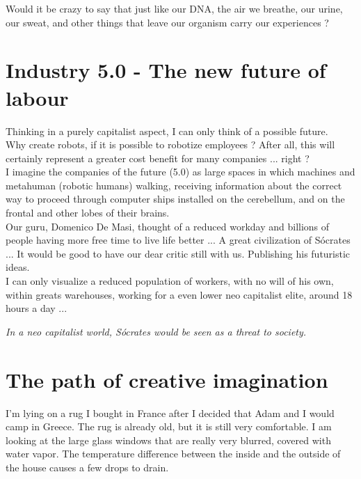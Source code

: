 \documentclass[11pt]{book}
\begin{document}
\noindent Would it be crazy to say that just like our DNA, the air we breathe, our urine, our sweat, and other things that leave our organism carry our experiences ?

\chapter{Industry 5.0 - The new future of labour}

\noindent Thinking in a purely capitalist aspect, I can only think of a possible future. \\

\noindent Why create robots, if it is possible to robotize employees ? After all, this will certainly represent a greater cost benefit for many companies ... right ? \\

\noindent I imagine the companies of the future (5.0) as large spaces in which machines and metahuman (robotic humans) walking, receiving information about the correct way to proceed through computer ships installed on the cerebellum, and on the frontal and other lobes of their brains. \\

\noindent Our guru, Domenico De Masi, thought of a reduced workday and billions of people having more free time to live life better ... A great civilization of Sócrates ... It would be good to have our dear critic still with us. Publishing his futuristic ideas. \\

\noindent I can only visualize a reduced population of workers, with no will of his own, within greats warehouses, working for a even lower neo capitalist elite, around 18 hours a day ...

\noindent \begin{center} \emph{In a neo capitalist world, Sócrates would be seen as a threat to society.} \end{center}

\chapter{The path of creative imagination}

\noindent I'm lying on a rug I bought in France after I decided that Adam and I would camp in Greece. The rug is already old, but it is still very comfortable. I am looking at the large glass windows that are really very blurred, covered with water vapor. The temperature difference between the inside and the outside of the house causes a few drops to drain. \\
\end{document}
